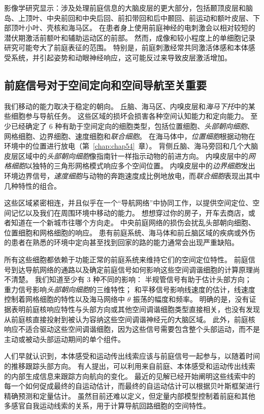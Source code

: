 影像学研究显示：涉及处理前庭信息的大脑皮层的更大部分，包括颞顶皮层和脑岛、上顶叶、中央前回和中央后回、前扣带回和后中颞回、前运动和额叶皮层、下部顶叶小叶、壳核和海马区。
在患者身上使用前庭神经的电刺激会以相对较短的潜伏期激活前额叶和辅助运动区的前部。
然而，成像和较小程度上的单细胞记录研究可能夸大了前庭表征的范围。
特别是，前庭刺激经常共同激活体感和本体感受系统，并引起姿势和动眼神经响应，这可能反过来导致皮层激活增加。



\subsection{前庭信号对于空间定向和空间导航至关重要}

我们移动的能力取决于稳定的朝向。
丘脑、海马区、内嗅皮层和\textit{海马下托}中的某些细胞参与导航任务。
这些区域的损坏会损害各种空间认知能力和定向能力。
至少已经确定了 6 种有助于空间定向的细胞类型，包括位置细胞、\textit{头部朝向细胞}、网格细胞、边界细胞、速度细胞和\textit{联合细胞}。
在海马体中，\textit{位置细胞}根据动物在环境中的位置进行放电（第~\ref{chap:chap54}~章）。
背侧丘脑、海马旁回和几个大脑皮层区域中的\textit{头部朝向细胞}像指南针一样指示动物的前进方向。
内嗅皮层中的\textit{网格细胞}以独特的三角形网格模式响应多个空间位置。
内嗅皮层中的\textit{边界细胞}发出环境边界信号，\textit{速度细胞}与动物的奔跑速度成比例地放电，而\textit{联合细胞}表现出其中几种特性的组合。


这些区域紧密相连，并且似乎在一个“导航网络”中协同工作，以提供空间定位、空间记忆以及我们在周围环境中移动的能力。
想想穿过你的房子，开车去商店，或者知道在一个新城市往哪个方向走。
中央前庭网络的损伤会扰乱头部朝向细胞、位置细胞和网格细胞的响应。
患有前庭系统、海马体和前丘脑区域的疾病或外伤的患者在熟悉的环境中定向甚至找到回家的路的能力通常会出现严重缺陷。


所有这些细胞都依赖于功能正常的前庭系统来维持它们的空间定位特性。
前庭信号到达导航网络的通路以及确定前庭信号如何影响这些空间调谐细胞的计算原理尚不清楚。
我们知道至少有 3 种不同的影响： 半规管信号有助于估计头部方向；
重力信号影响\textit{头部朝向细胞}的三维特性；
和平移信号影响线速度的估计，线速度控制着网格细胞的特性以及海马网络中 $\theta$ 振荡的幅度和频率。
明确的是，没有证据表明前庭核响应特性与头部方向或其他空间调谐细胞类型直接相关，也没有发现从前庭核直接投射到被认为容纳这些空间调谐神经元的大脑区域。
此外，前庭核响应不适合驱动这些空间调谐细胞，因为这些信号需要包含整个头部运动，而不是主动或被动头部运动期间的单个组件。


人们早就认识到，本体感受和运动传出线索应该与前庭信号一起参与，以随着时间的推移跟踪头部方向。
有人提出，可以利用来自前庭、本体感受和运动传出线索的内部生成信息来跟踪方向航向的变化。
最近的见解已经开始阐明这些线索中的每一个如何促成最终的自运动估计，而最终的自运动估计可以根据贝叶斯框架进行精确预测和定量估计。
虽然目前还难以定义，但定量内部模型控制着前庭和其他多感官自我运动线索的关系，用于计算导航回路细胞的空间特性。




